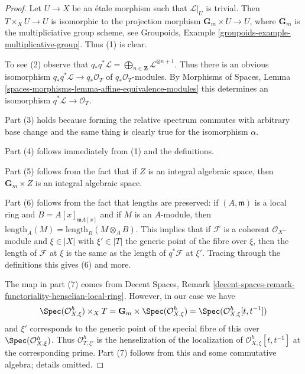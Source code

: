 \begin{proof}
Let $U \to X$ be an \'etale morphism such that $\mathcal{L}|_U$
is trivial. Then $T \times_X U \to U$ is isomorphic to the projection
morphism $\mathbf{G}_m \times U \to U$, where
$\mathbf{G}_m$ is the multipliciative group scheme, see
Groupoids, Example \ref{groupoids-example-multiplicative-group}.
Thus (1) is clear.

\medskip\noindent
To see (2) observe that
$q_*q^*\mathcal{L} =
\bigoplus_{n \in \mathbf{Z}} \mathcal{L}^{\otimes n + 1}$.
Thus there is an obvious isomorphism
$q_*q^*\mathcal{L} \to q_*\mathcal{O}_T$
of $q_*\mathcal{O}_T$-modules. By Morphisms of Spaces, Lemma
\ref{spaces-morphisms-lemma-affine-equivalence-modules}
this determines an isomorphism $q^*\mathcal{L} \to \mathcal{O}_T$.

\medskip\noindent
Part (3) holds because forming the relative spectrum commutes
with arbitrary base change and the same thing is clearly true
for the isomorphism $\alpha$.

\medskip\noindent
Part (4) follows immediately from (1) and the definitions.

\medskip\noindent
Part (5) follows from the fact that if $Z$ is an integral algebraic
space, then $\mathbf{G}_m \times Z$ is an integral algebraic space.

\medskip\noindent
Part (6) follows from the fact that lengths are preserved:
if $(A, \mathfrak m)$ is a local ring and $B = A[x]_{\mathfrak m A[x]}$
and if $M$ is an $A$-module, then
$\text{length}_A(M) = \text{length}_B(M \otimes_A B)$.
This implies that if $\mathcal{F}$ is a coherent
$\mathcal{O}_X$-module and $\xi \in |X|$ with $\xi' \in |T|$
the generic point of the fibre over $\xi$, then
the length of $\mathcal{F}$ at $\xi$ is the same as the
length of $q^*\mathcal{F}$ at $\xi'$.
Tracing through the definitions this gives (6) and more.

\medskip\noindent
The map in part (7) comes from Decent Spaces, Remark
\ref{decent-spaces-remark-functoriality-henselian-local-ring}.
However, in our case we have
$$
\Spec(\mathcal{O}_{X, \xi}^h) \times_X T =
\mathbf{G}_m \times \Spec(\mathcal{O}_{X, \xi}^h) =
\Spec(\mathcal{O}_{X, \xi}^h[t, t^{-1}])
$$
and $\xi'$ corresponds to the generic point of the special
fibre of this over $\Spec(\mathcal{O}_{X, \xi}^h)$. Thus
$\mathcal{O}_{T, \xi'}^h$ is the henselization of the localization
of $\mathcal{O}_{X, \xi}^h[t, t^{-1}]$ at the corresponding prime.
Part (7) follows from this and some commutative algebra; details omitted.
\end{proof}

